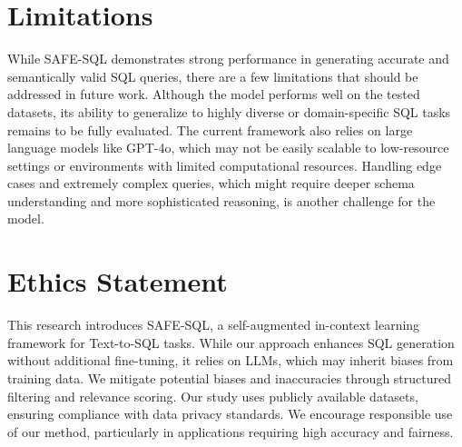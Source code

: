 \section*{Limitations}
While SAFE-SQL demonstrates strong performance in generating accurate and semantically valid SQL queries, there are a few limitations that should be addressed in future work. Although the model performs well on the tested datasets, its ability to generalize to highly diverse or domain-specific SQL tasks remains to be fully evaluated. The current framework also relies on large language models like GPT-4o, which may not be easily scalable to low-resource settings or environments with limited computational resources.  Handling edge cases and extremely complex queries, which might require deeper schema understanding and more sophisticated reasoning, is another challenge for the model. 

\section*{Ethics Statement}
This research introduces SAFE-SQL, a self-augmented in-context learning framework for Text-to-SQL tasks. While our approach enhances SQL generation without additional fine-tuning, it relies on LLMs, which may inherit biases from training data. We mitigate potential biases and inaccuracies through structured filtering and relevance scoring. Our study uses publicly available datasets, ensuring compliance with data privacy standards. We encourage responsible use of our method, particularly in applications requiring high accuracy and fairness.


